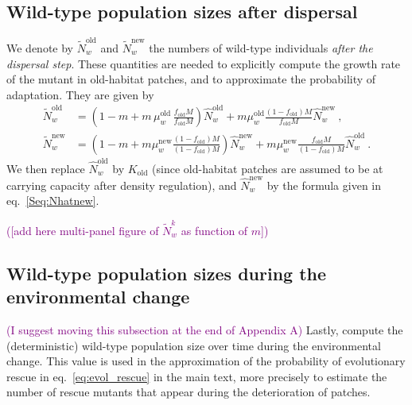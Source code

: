 \documentclass[11pt]{article}
\newcommand{\florence}[1]{\textcolor{purple}{(#1)}} %
\begin{document}
\subsection{Wild-type population sizes after dispersal}

We denote by $\widetilde{N}_w^{\text{old}}$ and $\widetilde{N}_w^{\text{new}}$ the numbers of wild-type individuals \textit{after the dispersal step}. These quantities are needed to explicitly compute the growth rate of the mutant in old-habitat patches, and to approximate the probability of adaptation. They are given by
%
\begin{subequations}\label{Seq:Ntilde}
\begin{align}
\widetilde{N}_w^{\text{old}} &= \left(1-m + m\, \mu_w^{\text{old}} \,  \frac{f_{\text{old}}M}{f_{\text{old}}M} \right) \widehat{N}_w^{\text{old}} + m \mu_w^{\text{old}} \frac{(1-f_{\text{old}})M}{f_{\text{old}}M}\widehat{N}_w^{\text{new}}\ , \label{Seq:Ntildeold}\\
%
%
\widetilde{N}_w^{\text{new}} &= \left(1-m + m \mu_w^{\text{new}} \frac{(1-f_{\text{old}})M}{(1-f_{\text{old}})M}\right)\widehat{N}_w^{\text{new}} + m \mu_w^{\text{new}} \frac{f_{\text{old}} M}{(1-f_{\text{old}})M} \widehat{N}_w^{\text{old}}\ .\label{Seq:Ntildenew}
\end{align}
\end{subequations}
%
We then replace $\widehat{N}_w^{\text{old}}$ by $K_{\text{old}}$ (since old-habitat patches are assumed to be at carrying capacity after density regulation), and $\widehat{N}_w^{\text{new}}$ by the formula given in eq.~\eqref{Seq:Nhatnew}.

\florence{[add here multi-panel figure of $\tilde{N}_w^k$ as function of $m$]}

\subsection{Wild-type population sizes during the environmental change \label{sec:app:WTpopsizeEnv}}
\florence{I suggest moving this subsection at the end of Appendix A}
Lastly, compute the (deterministic) wild-type population size over time during the environmental change. This value is used in the approximation of the probability of evolutionary rescue in eq.~\eqref{eq:evol_rescue} in the main text, more precisely to estimate the number of rescue mutants that appear during the deterioration of patches.
\end{document}
